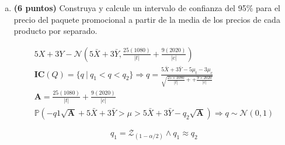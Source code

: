 \documentclass[../main.tex]{subfiles}
\begin{document}
\begin{enumerate}[(a)]
\item \textbf{(6 puntos)} Construya y calcule un intervalo de confianza del 95\% para el precio del paquete promocional a partir de la media de los precios de cada producto por separado.

\begin{equation}
\begin{split}
5X + 3Y - \mathcal{N}(5 \bar{X} + 3 \bar{Y}, \frac{25(1080)}{|t|} + \frac{9(2020)}{|c|}) \\
\textbf{IC}(Q) = \{q \ |\  q_1 < q < q_2\} \Rightarrow q = \frac{5\bar{X} + 3\bar{Y} - 5\mu_t - 3\mu_c}{\sqrt{\frac{25 \times 1080}{|t|} + + \frac{9 \times 2020}{|c|}}} 		\\
\textbf{A} = \frac{25(1080)}{|t|} + \frac{9(2020)}{|c|} \\
\mathbb{P} \left( -q1 \sqrt{\textbf{A}} + 5 \bar{X} + 3 \bar{Y} > \mu > 5 \bar{X} +
3 \bar{Y} - q_2 \sqrt{\textbf{A}} \right) \Rightarrow q \sim \mathcal{N}(0, 1)
\end{split}
\end{equation}

$$q_1 = \mathcal{Z}_{(1-\alpha / 2)} \wedge q_1 \approx q_2$$


\end{enumerate}
\end{document}
